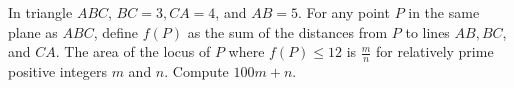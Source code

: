 In triangle $ABC$, $BC=3, CA=4$, and $AB=5$. For any point $P$ in the same plane as $ABC$, define $f(P)$ as the sum of the distances from $P$ to lines $AB, BC$, and $CA$. The area of the locus of $P$ where $f(P)\leq 12$ is $\frac{m}{n}$ for relatively prime positive integers $m$ and $n$. Compute $100m+n$.
